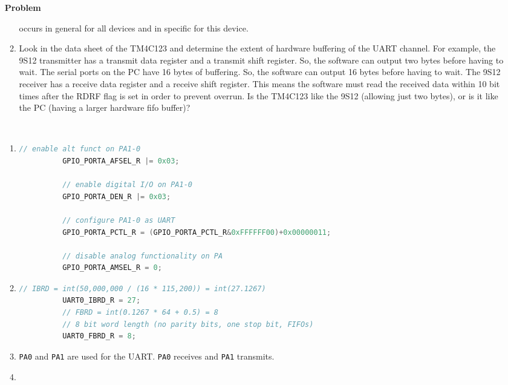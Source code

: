 \documentclass[12pt]{article}
\newenvironment{Ex}{\textbf{Problem}\vspace{.75em}\\}{}
\begin{document}
\begin{enumerate}
\begin{Ex}
\begin{enumerate}
      occurs in general for all devices and in specific for this
      device.
    \item Look in the data sheet of the TM4C123 and determine the
      extent of hardware buffering of the UART channel. For example,
      the 9S12 transmitter has a transmit data register and a transmit
      shift register. So, the software can output two bytes before
      having to wait. The serial ports on the PC have 16 bytes of
      buffering. So, the software can output 16 bytes before having to
      wait. The 9S12 receiver has a receive data register and a
      receive shift register. This means the software must read the
      received data within 10 bit times after the RDRF flag is set in
      order to prevent overrun. Is the TM4C123 like the 9S12 (allowing
      just two bytes), or is it like the PC (having a larger hardware
      fifo buffer)?
    \end{enumerate}
    \begin{solution} \hfill \vspace{.75em} \\
      \begin{enumerate}
      \item \hfill
        \begin{lstlisting}[language=C]
          // enable alt funct on PA1-0
          GPIO_PORTA_AFSEL_R |= 0x03;

          // enable digital I/O on PA1-0
          GPIO_PORTA_DEN_R |= 0x03;

          // configure PA1-0 as UART
          GPIO_PORTA_PCTL_R = (GPIO_PORTA_PCTL_R&0xFFFFFF00)+0x00000011;

          // disable analog functionality on PA
          GPIO_PORTA_AMSEL_R = 0;
        \end{lstlisting}
      \item \hfill
        \begin{lstlisting}[language=C]
          // IBRD = int(50,000,000 / (16 * 115,200)) = int(27.1267)
          UART0_IBRD_R = 27;
          // FBRD = int(0.1267 * 64 + 0.5) = 8
          // 8 bit word length (no parity bits, one stop bit, FIFOs)
          UART0_FBRD_R = 8;
        \end{lstlisting}

      \item \verb|PA0| and \verb|PA1| are used for the
        UART. \verb|PA0| receives and \verb|PA1| transmits.
      \item \hfill
        \begin{lstlisting}[language=C]


\end{lstlisting}
\end{enumerate}
\end{solution}
\end{Ex}
\end{enumerate}
\end{document}
